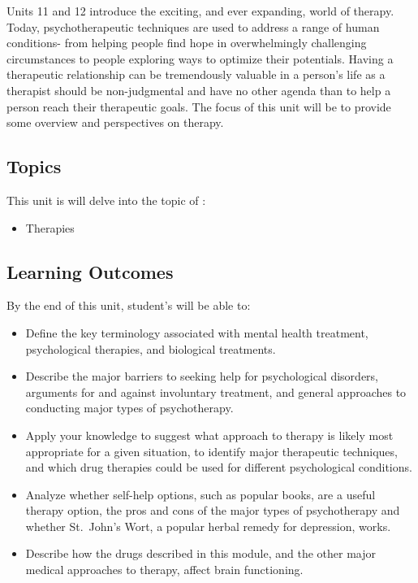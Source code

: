 \documentclass[
]{book}
\providecommand{\tightlist}{%
  \setlength{\itemsep}{0pt}\setlength{\parskip}{0pt}}
\begin{document}
Units 11 and 12 introduce the exciting, and ever expanding, world of therapy. Today, psychotherapeutic techniques are used to address a range of human conditions- from helping people find hope in overwhelmingly challenging circumstances to people exploring ways to optimize their potentials. Having a therapeutic relationship can be tremendously valuable in a person's life as a therapist should be non-judgmental and have no other agenda than to help a person reach their therapeutic goals. The focus of this unit will be to provide some overview and perspectives on therapy.

\hypertarget{topics-9}{%
\subsection*{Topics}\label{topics-9}}

This unit is will delve into the topic of :

\begin{itemize}
\tightlist
\item
  Therapies
\end{itemize}

\hypertarget{learning-outcomes-9}{%
\subsection*{Learning Outcomes}\label{learning-outcomes-9}}

By the end of this unit, student's will be able to:

\begin{itemize}
\tightlist
\item
  Define the key terminology associated with mental health treatment, psychological therapies, and biological treatments.\\
\item
  Describe the major barriers to seeking help for psychological disorders, arguments for and against involuntary treatment, and general approaches to conducting major types of psychotherapy.\\
\item
  Apply your knowledge to suggest what approach to therapy is likely most appropriate for a given situation, to identify major therapeutic techniques, and which drug therapies could be used for different psychological conditions.\\
\item
  Analyze whether self-help options, such as popular books, are a useful therapy option, the pros and cons of the major types of psychotherapy and whether St.~John's Wort, a popular herbal remedy for depression, works.\\
\item
  Describe how the drugs described in this module, and the other major medical approaches to therapy, affect brain functioning.
\end{itemize}
\end{document}
